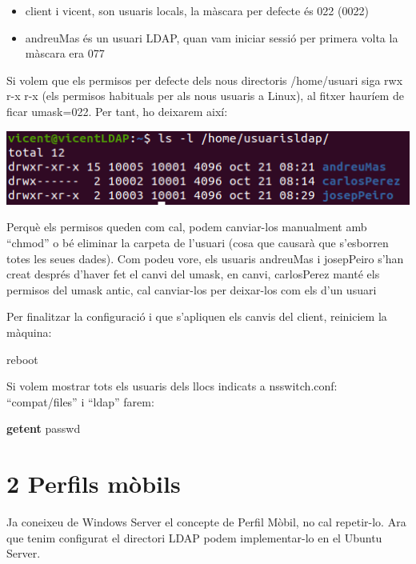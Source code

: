 \documentclass[
  12 pt,
  a4paper,
]{article}
\newenvironment{Shaded}{\begin{snugshade}}{\end{snugshade}}
\newcommand{\ExtensionTok}[1]{#1}
\newcommand{\FunctionTok}[1]{\textcolor[rgb]{0.13,0.29,0.53}{\textbf{#1}}}
\newcommand{\NormalTok}[1]{#1}
\begin{document}
\begin{itemize}
\item
  client i vicent, son usuaris locals, la màscara per defecte és 022
  (0022)
\item
  andreuMas és un usuari LDAP, quan vam iniciar sessió per primera volta
  la màscara era 077
\end{itemize}

Si volem que els permisos per defecte dels nous directoris /home/usuari
siga rwx r-x r-x (els permisos habituals per als nous usuaris a Linux),
al fitxer hauríem de ficar umask=022. Per tant, ho deixarem així:

\includegraphics{png/libpam11.png}

Perquè els permisos queden com cal, podem canviar-los manualment amb
``chmod'' o bé eliminar la carpeta de l'usuari (cosa que causarà que
s'esborren totes les seues dades). Com podeu vore, els usuaris andreuMas
i josepPeiro s'han creat després d'haver fet el canvi del umask, en
canvi, carlosPerez manté els permisos del umask antic, cal canviar-los
per deixar-los com els d'un usuari

Per finalitzar la configuració i que s'apliquen els canvis del client,
reiniciem la màquina:

\begin{Shaded}
\begin{Highlighting}[]
\ExtensionTok{reboot}
\end{Highlighting}
\end{Shaded}

Si volem mostrar tots els usuaris dels llocs indicats a nsswitch.conf:
``compat/files'' i ``ldap'' farem:

\begin{Shaded}
\begin{Highlighting}[]
\FunctionTok{getent}\NormalTok{ passwd}
\end{Highlighting}
\end{Shaded}

\section{2 Perfils mòbils}\label{perfils-muxf2bils}

Ja coneixeu de Windows Server el concepte de Perfil Mòbil, no cal
repetir-lo. Ara que tenim configurat el directori LDAP podem
implementar-lo en el Ubuntu Server.
\end{document}
